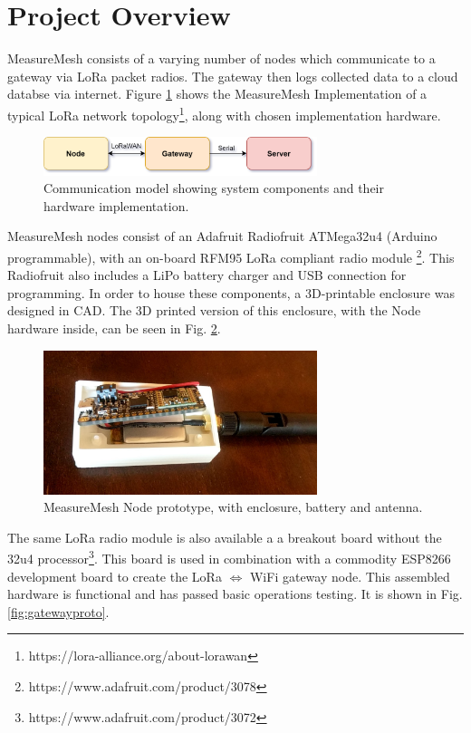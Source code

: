 \documentclass{IEEEtran}
\begin{document}
\section{Project Overview} 

MeasureMesh consists of a varying number of nodes which communicate to a gateway via LoRa packet radios. The gateway then logs collected data to a cloud databse via internet. Figure \ref{fig:mmoverview} shows the MeasureMesh Implementation of a typical LoRa network topology\footnote{https://lora-alliance.org/about-lorawan}, along with chosen implementation hardware.



\begin{figure}[h!]
    \centering
    \includegraphics[width=8cm]{images/ComonentOverview.png}
    \caption{Communication model showing system components and their hardware implementation.}
    \label{fig:mmoverview}
\end{figure}


 MeasureMesh nodes consist of an Adafruit Radiofruit ATMega32u4 (Arduino programmable), with an on-board RFM95 LoRa compliant radio module \footnote{https://www.adafruit.com/product/3078}. This Radiofruit also includes a LiPo battery charger and USB connection for programming. In order to house these components, a 3D-printable enclosure was designed in CAD. The 3D printed version of this enclosure, with the Node hardware inside, can be seen in Fig. \ref{fig:nodeproto}. 


\begin{figure}
    \centering
    \includegraphics[width=8cm]{images/nodePrototype}
    \caption{MeasureMesh Node prototype, with enclosure, battery and antenna.}
    \label{fig:nodeproto}
\end{figure}

The same LoRa radio module is also available a a breakout board without the 32u4 processor\footnote{https://www.adafruit.com/product/3072}. This board is used in combination with a commodity ESP8266 development board to create the LoRa $\Longleftrightarrow$ WiFi gateway node. This assembled hardware is functional and has passed basic operations testing. It is shown in Fig. \ref{fig:gatewayproto}.
\end{document}
